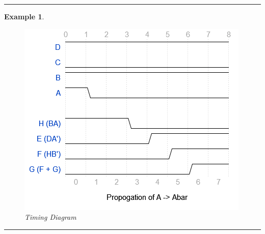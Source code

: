 \documentclass[12pt]{article}
\newtheorem{example}{Example}
\newenvironment{examp}
{\vspace{0.5cm}
\hrule
\begin{example}}
{\hrule
\vspace{0.5cm}
\end{example}}
\begin{document}
\begin{examp}
	\begin{figure}[H]
		\centering
		\includegraphics[scale=.45]{examp051.png}
		\caption{Timing Diagram}
	\end{figure}

\end{examp}
\end{document}
